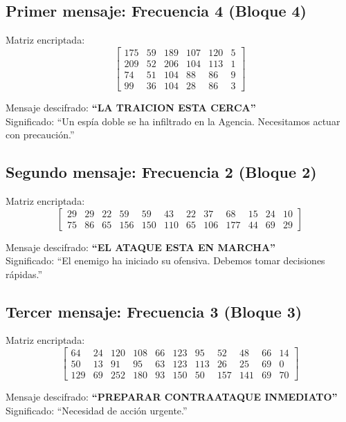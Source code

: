 \documentclass[10pt,a4paper]{article}
\begin{document}
\subsection*{Primer mensaje: Frecuencia 4 (Bloque 4)}
Matriz encriptada:
\[
\left[
\begin{array}{cccccc}
175 & 59 & 189 & 107 & 120 & 5 \\
209 & 52 & 206 & 104 & 113 & 1 \\
74 & 51 & 104 & 88 & 86 & 9 \\
99 & 36 & 104 & 28 & 86 & 3
\end{array}
\right]
\]

Mensaje descifrado: \textbf{``LA TRAICION ESTA CERCA''} \\
Significado: ``Un espía doble se ha infiltrado en la Agencia. Necesitamos actuar con precaución.''

\subsection*{Segundo mensaje: Frecuencia 2 (Bloque 2)}
Matriz encriptada:
\[
\left[
\begin{array}{cccccccccccc}
29 & 29 & 22 & 59 & 59 & 43 & 22 & 37 & 68 & 15 & 24 & 10 \\
75 & 86 & 65 & 156 & 150 & 110 & 65 & 106 & 177 & 44 & 69 & 29
\end{array}
\right]
\]

Mensaje descifrado: \textbf{``EL ATAQUE ESTA EN MARCHA''} \\
Significado: ``El enemigo ha iniciado su ofensiva. Debemos tomar decisiones rápidas.''

\subsection*{Tercer mensaje: Frecuencia 3 (Bloque 3)}
Matriz encriptada:
\[
\left[
\begin{array}{ccccccccccc}
64 & 24 & 120 & 108 & 66 & 123 & 95 & 52 & 48 & 66 & 14 \\
50 & 13 & 91 & 95 & 63 & 123 & 113 & 26 & 25 & 69 & 0 \\
129 & 69 & 252 & 180 & 93 & 150 & 50 & 157 & 141 & 69 & 70
\end{array}
\right]
\]

Mensaje descifrado: \textbf{``PREPARAR CONTRAATAQUE INMEDIATO''} \\
Significado: ``Necesidad de acción urgente.''

\end{document}
